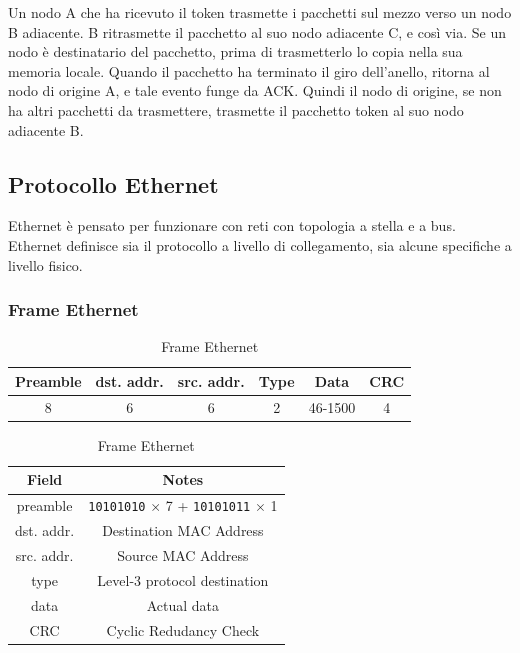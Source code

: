 \documentclass[12pt,a4paper]{article}
\begin{document}
Un nodo A che ha ricevuto il token trasmette i pacchetti sul mezzo verso
un nodo B adiacente. B ritrasmette il pacchetto al suo nodo adiacente C,
e così via.
Se un nodo è destinatario del pacchetto, prima di trasmetterlo lo copia
nella sua memoria locale.
Quando il pacchetto ha terminato il giro dell'anello, ritorna al nodo di
origine A, e tale evento funge da ACK.
Quindi il nodo di origine, se non ha altri pacchetti da trasmettere,
trasmette il pacchetto token al suo nodo adiacente B.

\subsection{Protocollo Ethernet}
Ethernet è pensato per funzionare con reti con topologia a stella e a
bus. Ethernet definisce sia il protocollo a livello di collegamento,
sia alcune specifiche a livello fisico.

\subsubsection{Frame Ethernet}
\begin{table}[H]
  \centering
  \begin{tabular}{| c | c | c | c | c | c |}\hline
  Preamble  & dst. addr.  & src. addr.  & Type  & Data    & CRC \\ \hline
  8         & 6           & 6           & 2     & 46-1500 & 4   \\ \hline
  \end{tabular}

  \begin{tabular}{| c | c |}\hline
    Field       & Notes                                   \\ \hline
    preamble    & \texttt{10101010} $ \times $ 7 + \texttt{10101011} $ \times $ 1   \\ \hline
    dst. addr.  & Destination MAC Address                 \\ \hline
    src. addr.  & Source MAC Address                      \\ \hline
    type        & Level-3 protocol destination            \\ \hline
    data        & Actual data                             \\ \hline
    CRC         & Cyclic Redudancy Check                  \\ \hline
  \end{tabular}
  \caption{Frame Ethernet}
\end{table}
\end{document}
